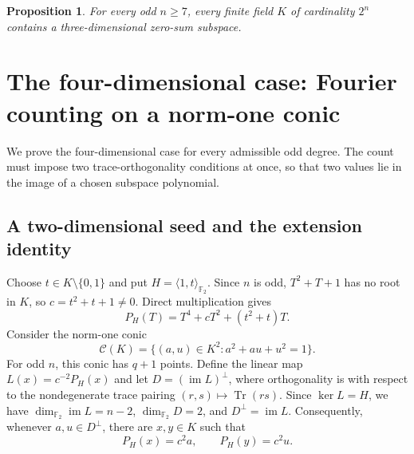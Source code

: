 \documentclass[11pt]{amsart}
\numberwithin{equation}{section}
\newtheorem{proposition}[theorem]{Proposition}
\theoremstyle{definition}
\theoremstyle{remark}
\newcommand{\Ftwo}{\mathbb F_2}
\newcommand{\tr}{\operatorname{Tr}}
\newcommand{\dimf}{\dim_{\Ftwo}}
\begin{document}
\begin{proposition}\label{prop:k3}
For every odd $n\ge7$, every finite field $K$ of cardinality $2^n$ contains a three-dimensional zero-sum subspace.
\end{proposition}

\section{The four-dimensional case: Fourier counting on a norm-one conic}

We prove the four-dimensional case for every admissible odd degree. The count must impose two trace-orthogonality conditions at once, so that two values lie in the image of a chosen subspace polynomial.

\subsection{A two-dimensional seed and the extension identity}

Choose $t\in K\setminus\{0,1\}$ and put $H=\langle1,t\rangle_{\Ftwo}$. Since $n$ is odd, $T^2+T+1$ has no root in $K$, so $c=t^2+t+1\ne0$. Direct multiplication gives
\[
 P_H(T)=T^4+cT^2+(t^2+t)T.
\]
Consider the norm-one conic
\begin{equation}\label{eq:normcurve}
 \mathcal C(K)=\{(a,u)\in K^2:a^2+au+u^2=1\}.
\end{equation}
For odd $n$, this conic has $q+1$ points. Define the linear map $L(x)=c^{-2}P_H(x)$ and let $D=(\operatorname{im}L)^\perp$, where orthogonality is with respect to the nondegenerate trace pairing $(r,s)\mapsto\tr(rs)$. Since $\ker L=H$, we have $\dimf\operatorname{im}L=n-2$, $\dimf D=2$, and $D^\perp=\operatorname{im}L$. Consequently, whenever $a,u\in D^\perp$, there are $x,y\in K$ such that
\[
 P_H(x)=c^2a,\qquad P_H(y)=c^2u.
\]
\end{document}
